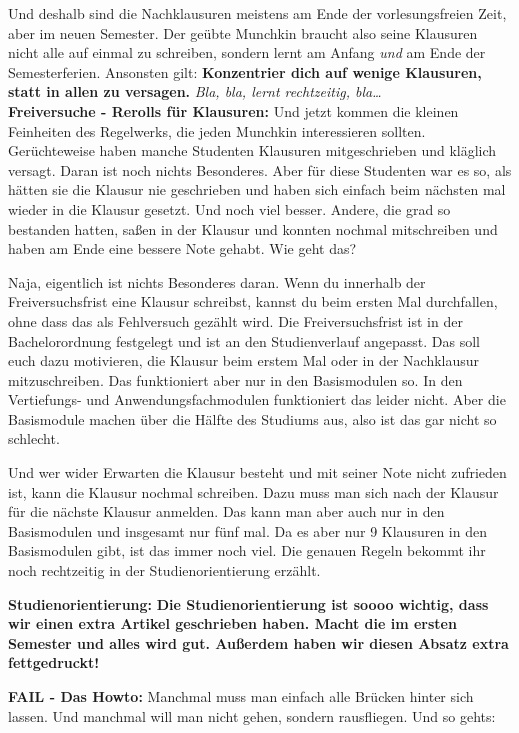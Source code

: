 Und deshalb sind die Nachklausuren meistens am Ende der vorlesungsfreien Zeit, aber im neuen Semester. Der
ge\"ubte Munchkin braucht also seine Klausuren nicht alle auf einmal zu
schreiben, sondern lernt am Anfang \emph{und} am Ende der Semesterferien.
Ansonsten gilt: \textbf{Konzentrier dich auf wenige Klausuren, statt in allen zu versagen.}
\emph{Bla, bla, lernt rechtzeitig, bla\dots}\\

\textbf{Freiversuche - Rerolls f\"ur Klausuren:}
Und jetzt kommen die kleinen Feinheiten des Regelwerks, die jeden Munchkin interessieren sollten.
Ger\"uchteweise haben manche Studenten Klausuren mitgeschrieben und kl\"aglich versagt. Daran ist noch nichts Besonderes.
Aber f\"ur diese Studenten war es so, als h\"atten sie die Klausur nie
geschrieben und haben sich einfach beim n\"achsten mal wieder in die Klausur
gesetzt. Und noch viel besser. Andere, die grad so bestanden hatten, sa{\ss}en
in der Klausur und konnten nochmal mitschreiben und haben am Ende eine bessere
Note gehabt. Wie geht das?

Naja, eigentlich ist nichts Besonderes daran. Wenn du innerhalb der
Freiversuchsfrist eine Klausur schreibst, kannst du beim ersten Mal
durchfallen, ohne dass das als Fehlversuch gez\"ahlt wird.
Die Freiversuchsfrist ist in der Bachelorordnung festgelegt und ist an den Studienverlauf angepasst.
Das soll euch dazu motivieren, die Klausur beim erstem Mal oder in der Nachklausur mitzuschreiben.
Das funktioniert aber nur in den Basismodulen so. In den Vertiefungs- und Anwendungsfachmodulen funktioniert das leider nicht.
Aber die Basismodule machen \"uber die H\"alfte des Studiums aus, also ist das gar nicht so schlecht.

Und wer wider Erwarten die Klausur besteht und mit seiner Note nicht zufrieden
ist, kann die Klausur nochmal schreiben. Dazu muss man sich nach der Klausur
f\"ur die n\"achste Klausur anmelden. Das kann man aber auch nur in den
Basismodulen und insgesamt nur f\"unf mal. Da es aber nur 9 Klausuren in den Basismodulen gibt,
ist das immer noch viel. Die genauen Regeln bekommt ihr noch rechtzeitig in der Studienorientierung erz\"ahlt.

\textbf{Studienorientierung:}
\textbf{
Die Studienorientierung ist soooo wichtig, dass wir einen extra Artikel geschrieben haben. Macht die im ersten Semester und alles wird gut. Au{\ss}erdem haben wir diesen Absatz extra fettgedruckt!}

\textbf{FAIL - Das Howto:}
Manchmal muss man einfach alle Br\"ucken hinter sich lassen. Und manchmal will man nicht gehen, sondern rausfliegen. Und so gehts:

